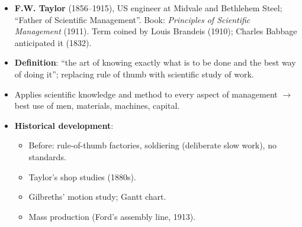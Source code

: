 \begin{itemize}
  \item \textbf{F.W. Taylor} (1856--1915), US engineer at Midvale and Bethlehem Steel;
    ``Father of Scientific Management''. Book: \textit{Principles of Scientific Management}
    (1911). Term coined by Louis Brandeis (1910); Charles Babbage anticipated it (1832).
  \item \textbf{Definition}: ``the art of knowing exactly what is to be done and the best way
    of doing it''; replacing rule of thumb with scientific study of work.
  \item Applies scientific knowledge and method to every aspect of management
    $\rightarrow$ best use of men, materials, machines, capital.
  \item \textbf{Historical development}:
  \begin{itemize}
    \item Before: rule-of-thumb factories, soldiering (deliberate slow work), no standards.
    \item Taylor's shop studies (1880s).
    \item Gilbreths' motion study; Gantt chart.
    \item Mass production (Ford's assembly line, 1913).
  \end{itemize}
\end{itemize}

